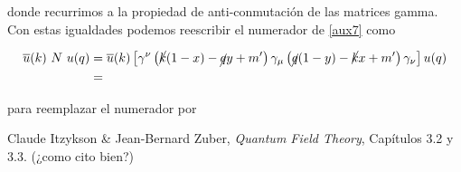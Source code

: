 \documentclass[tickz]{article}
\numberwithin{equation}{section}
\begin{document}
donde recurrimos a la propiedad de anti-conmutación de las matrices gamma. Con estas igualdades podemos reescribir el numerador de \ref{aux7} como

\begin{equation}\label{key}
\begin{aligned}
\overline{u}(k) \ N \ u(q) &= \overline{u}(k) \left[\gamma^{\nu}\left(\cancel{k}(1-x) -\cancel{q}y+m'\right)\gamma_{\mu}\left( \cancel{q}(1-y) -\cancel{k}x +m'\right)\gamma_{\nu}\right] u(q)\\
&=
\end{aligned}
\end{equation}

para reemplazar el numerador por 



\begin{thebibliography}{9}
	
	Claude Itzykson \& Jean-Bernard Zuber,
	\textit{Quantum Field Theory},
	Capítulos 3.2 y 3.3. (¿como cito bien?)
	
\end{thebibliography}	
	
	
\end{document}
